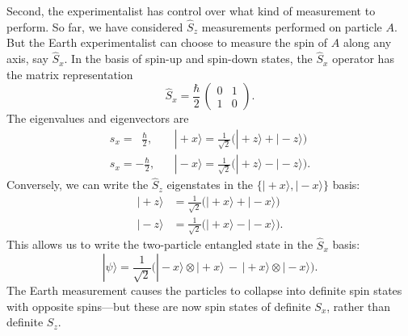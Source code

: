 \documentclass[pra,11pt]{revtex4}
\begin{document}
Second, the experimentalist has control over what kind of measurement
to perform.  So far, we have considered $\hat{S}_z$ measurements
performed on particle $A$.  But the Earth experimentalist can choose
to measure the spin of $A$ along any axis, say $\hat{S}_x$.  In the
basis of spin-up and spin-down states, the $\hat{S}_x$ operator has
the matrix representation
$$\hat{S}_x = \frac{\hbar}{2}\, \begin{pmatrix}0&1\\1&0\end{pmatrix}.$$
The eigenvalues and eigenvectors are
$$\begin{aligned}s_x = \;\;\frac{\hbar}{2},\; &\;\;\; |\!+\!x\rangle = \frac{1}{\sqrt{2}}\Big(|\!+\!z\rangle + |\!-\!z\rangle\Big) \\ s_x = -\frac{\hbar}{2}, &\;\;\; |\!-\!x\rangle = \frac{1}{\sqrt{2}}\Big(|\!+\!z\rangle - |\!-\!z\rangle\Big).\end{aligned}$$
Conversely, we can write the $\hat{S}_z$ eigenstates in the $\{|\!+\!x\rangle,|\!-\!x\rangle\}$ basis:
$$\begin{aligned}|\!+\!z\rangle &= \frac{1}{\sqrt{2}}\Big(|\!+\!x\rangle + |\!-\!x\rangle\Big) \\ |\!-\!z\rangle &= \frac{1}{\sqrt{2}}\Big(|\!+\!x\rangle - |\!-\!x\rangle\Big).\end{aligned}$$
This allows us to write the two-particle entangled state in the
$\hat{S}_x$ basis:
$$|\psi\rangle = \frac{1}{\sqrt{2}} \Big(|\!-\!x\rangle\otimes|\!+\!x\rangle \,-\, |\!+\!x\rangle\otimes|\!-\!x\rangle\Big).$$
The Earth measurement causes the particles to collapse into definite
spin states with opposite spins---but these are now spin states of
definite ${S}_x$, rather than definite ${S}_z$.
\end{document}
